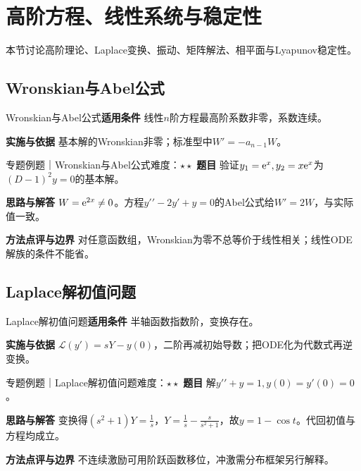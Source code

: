 \section{高阶方程、线性系统与稳定性}\label{mat:ode_systems}
\begin{examtip}本节讨论高阶理论、Laplace变换、振动、矩阵解法、相平面与Lyapunov稳定性。\end{examtip}
\subsection{Wronskian与Abel公式}\label{mat:ode_systems:wronskian}
\begin{method}{Wronskian与Abel公式}\textbf{适用条件} 线性$n$阶方程最高阶系数非零，系数连续。\par\textbf{实施与依据} 基本解的Wronskian非零；标准型中$W\prime=-a_{n-1}W$。\end{method}
\begin{example}{专题例题｜Wronskian与Abel公式}{难度：$\star\star$}
\textbf{题目} 验证$y_1=\mathrm{e}^x,y_2=x\mathrm{e}^x$为$(D-1)^2y=0$的基本解。\par\textbf{思路与解答} $W=\mathrm{e}^{2x}\ne0$。方程$y\prime\prime-2y\prime+y=0$的Abel公式给$W\prime=2W$，与实际值一致。\par\textbf{方法点评与边界} 对任意函数组，Wronskian为零不总等价于线性相关；线性ODE解族的条件不能省。
\end{example}
\subsection{Laplace解初值问题}\label{mat:ode_systems:laplaceode}
\begin{method}{Laplace解初值问题}\textbf{适用条件} 半轴函数指数阶，变换存在。\par\textbf{实施与依据} $\mathcal L(y\prime)=sY-y(0)$，二阶再减初始导数；把ODE化为代数式再逆变换。\end{method}
\begin{example}{专题例题｜Laplace解初值问题}{难度：$\star\star$}
\textbf{题目} 解$y\prime\prime+y=1,y(0)=y\prime(0)=0$。\par\textbf{思路与解答} 变换得$(s^2+1)Y=\frac{1}{s}$，$Y=\frac{1}{s}-\frac{s}{s^2+1}$，故$y=1-\cos t$。代回初值与方程均成立。\par\textbf{方法点评与边界} 不连续激励可用阶跃函数移位，冲激需分布框架另行解释。
\end{example}
